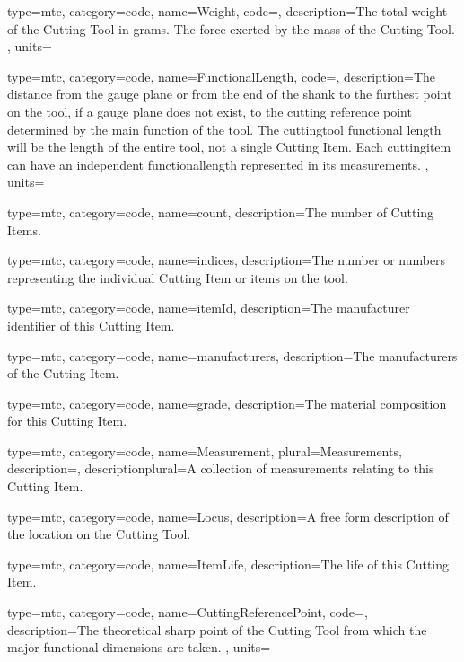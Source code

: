 {
  type=mtc,
  category=code,
  name={Weight},
  code=,
  description={The total weight of the Cutting Tool in grams. The force exerted by the mass of the Cutting Tool. },
  units=
}

{
  type=mtc,
  category=code,
  name={FunctionalLength},
  code=,
  description={The distance from the gauge plane or from the end of the shank to the furthest point on the tool, if a gauge plane does not exist, to the cutting reference point determined by the main function of the tool. The \gls{cuttingtool} functional length will be the length of the entire tool, not a single Cutting Item. Each \gls{cuttingitem} can have an independent \gls{functionallength} represented in its measurements. },
  units=
}

{
  type=mtc,
  category=code,
  name={count},
  description={The number of Cutting Items. }
}

{
  type=mtc,
  category=code,
  name={indices},
  description={The number or numbers representing the individual Cutting Item or items on the tool. }
}

{
  type=mtc,
  category=code,
  name={itemId},
  description={The manufacturer identifier of this Cutting Item. }
}

{
  type=mtc,
  category=code,
  name={manufacturers},
  description={The manufacturers of the Cutting Item. }
}

{
  type=mtc,
  category=code,
  name={grade},
  description={The material composition for this Cutting Item.}
}

{
  type=mtc,
  category=code,
  name={Measurement},
  plural={Measurements},
  description={},
  descriptionplural={A collection of measurements relating to this Cutting Item.}
}

{
  type=mtc,
  category=code,
  name={Locus},
  description={A free form description of the location on the Cutting Tool.}
}

{
  type=mtc,
  category=code,
  name={ItemLife},
  description={The life of this Cutting Item.}
}

{
  type=mtc,
  category=code,
  name={CuttingReferencePoint},
  code=,
  description={The theoretical sharp point of the Cutting Tool from which the major functional dimensions are taken. },
  units=
}

